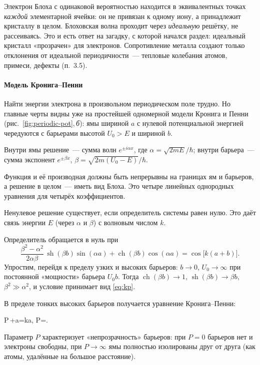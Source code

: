 \begin{glavnoe}
Электрон Блоха с одинаковой вероятностью находится в эквивалентных
точках \emph{каждой} элементарной ячейки: он не привязан к одному иону,
а принадлежит кристаллу в целом. Блоховская волна проходит через
\emph{идеальную} решётку, не рассеиваясь. Это и есть ответ на загадку,
с которой начался раздел: идеальный кристалл «прозрачен» для
электронов. Сопротивление металла создают только отклонения от
идеальной периодичности~— тепловые колебания атомов, примеси, дефекты
(п.~3.5).
\end{glavnoe}

\paragraph{Модель Кронига--Пенни}
Найти энергии электрона в произвольном периодическом поле трудно. Но
главные черты видны уже на простейшей одномерной модели Кронига и
Пенни (рис.~\ref{fig:periodic-pot},\,\textit{б}): ямы шириной $a$ с
нулевой потенциальной энергией чередуются с барьерами высотой $U_0>E$ и
шириной $b$.
\begin{shagi}
\item Внутри ямы решение~— сумма волн $e^{\pm i\alpha x}$, где
$\alpha=\sqrt{2mE}/\hbar$; внутри барьера~— сумма экспонент $e^{\pm\beta
x}$, $\beta=\sqrt{2m(U_0-E)}/\hbar$.
\item Функция и её производная должны быть непрерывны на границах ям и
барьеров, а решение в целом~— иметь вид Блоха. Это четыре линейных
однородных уравнения для четырёх коэффициентов.
\item Ненулевое решение существует, если определитель системы равен
нулю. Это даёт связь энергии $E$ (через $\alpha$ и $\beta$) с волновым
числом $k$.
\end{shagi}

\begin{podrobnee}
Определитель обращается в нуль при
\[
\frac{\beta^2-\alpha^2}{2\alpha\beta}\,\operatorname{sh}(\beta b)\sin(\alpha a)+
\operatorname{ch}(\beta b)\cos(\alpha a)=\cos\bigl[k(a+b)\bigr].
\]
Упростим, перейдя к пределу узких и высоких барьеров: $b\to0$,
$U_0\to\infty$ при постоянной «мощности» барьера $U_0b$. Тогда
$\operatorname{ch}(\beta b)\to1$, $\operatorname{sh}(\beta b)\to\beta b$,
$\beta^2\gg\alpha^2$, и условие принимает вид \eqref{eq:kp}.
\end{podrobnee}

В пределе тонких высоких барьеров получается уравнение Кронига--Пенни:
\begin{keyeq}\label{eq:kp}
P\,+\cos\alpha a=\cos ka,\qquad
P=.
\end{keyeq}
Параметр $P$ характеризует «непрозрачность» барьеров: при $P=0$
барьеров нет и электроны свободны, при $P\to\infty$ ямы полностью
изолированы друг от друга (как атомы, удалённые на большое расстояние).

